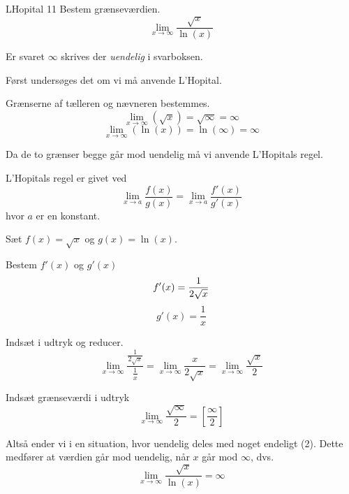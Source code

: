 \documentclass{article}
\begin{document}
\begin{exercise}{LHopital 11}
Bestem grænseværdien.
\[
\lim_{x \to \infty} \frac{\sqrt{x}}{\ln(x)}
\]

Er svaret $\infty$ skrives der \emph{uendelig} i svarboksen.


\hint
Først undersøges det om vi må anvende L'Hopital.

\hint
Grænserne af tælleren og nævneren bestemmes.
\[
\lim_{x \to \infty} (\sqrt{x}) = \sqrt{\infty} = \infty
\]
\[
\lim_{x \to \infty} (\ln(x)) = \ln(\infty) = \infty
\]

\hint
Da de to grænser begge går mod uendelig må vi anvende L'Hopitals regel.

\hint
L'Hopitals regel er givet ved
\[
\lim_{x \to a} \frac{f(x)}{g(x)} = \lim_{x \to a} \frac{f'(x)}{g'(x)}
\]
hvor $a$ er en konstant.

\hint
Sæt $f(x) = \sqrt{x}$ og $g(x) = \ln(x)$.

\hint
Bestem $f'(x)$ og $g'(x)$
\[
f'(x) = \frac{1}{2\sqrt{x}} \\
\]
\[
g'(x) = \frac{1}{x}
\]

\hint
Indsæt i udtryk og reducer.
\[
\lim_{x \to \infty} \frac{ \frac{1}{2 \sqrt{x}} }{ \frac{1}{x} } = \lim_{x \to \infty} \frac{x}{2 \sqrt{x}} = \lim_{x \to \infty} \frac{\sqrt{x}}{2}
\]

\hint
Indsæt grænseværdi i udtryk
\[
\lim_{x \to \infty} \frac{\sqrt{\infty}}{2} = \left[ \frac{\infty}{2} \right]
\]

\hint
Altså ender vi i en situation, hvor uendelig deles med noget endeligt (2). Dette medfører at værdien går mod uendelig, når $x$ går mod $\infty$, dvs.
\[
\lim_{x \to \infty} \frac{\sqrt{x}}{\ln(x)} = \infty
\]

\end{exercise}
\end{document}
